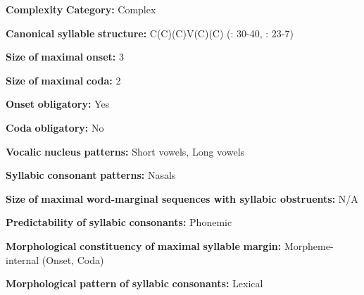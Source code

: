 \begin{styleBody}
\textbf{Complexity} \textbf{Category:} Complex
\end{styleBody}

\begin{styleBody}
\textbf{Canonical} \textbf{syllable} \textbf{structure:} C(C)(C)V(C)(C) (\citealt{Olsen2014}: 30-40, \citealt{Manley1972}: 23-7)
\end{styleBody}

\begin{styleBody}
\textbf{Size} \textbf{of} \textbf{maximal} \textbf{onset:} 3
\end{styleBody}

\begin{styleBody}
\textbf{Size} \textbf{of} \textbf{maximal} \textbf{coda:} 2
\end{styleBody}

\begin{styleBody}
\textbf{Onset} \textbf{obligatory:} Yes
\end{styleBody}

\begin{styleBody}
\textbf{Coda} \textbf{obligatory:} No
\end{styleBody}

\begin{styleBody}
\textbf{Vocalic} \textbf{nucleus} \textbf{patterns:} Short vowels, Long vowels
\end{styleBody}

\begin{styleBody}
\textbf{Syllabic} \textbf{consonant} \textbf{patterns:} Nasals
\end{styleBody}

\begin{styleBody}
\textbf{Size} \textbf{of} \textbf{maximal} \textbf{word{}-marginal sequences with syllabic obstruents:} N/A
\end{styleBody}

\begin{styleBody}
\textbf{Predictability} \textbf{of} \textbf{syllabic} \textbf{consonants:} Phonemic
\end{styleBody}

\begin{styleBody}
\textbf{Morphological} \textbf{constituency} \textbf{of} \textbf{maximal} \textbf{syllable} \textbf{margin:} Morpheme-internal (Onset, Coda)
\end{styleBody}

\begin{styleBody}
\textbf{Morphological} \textbf{pattern} \textbf{of} \textbf{syllabic} \textbf{consonants:} Lexical
\end{styleBody}


